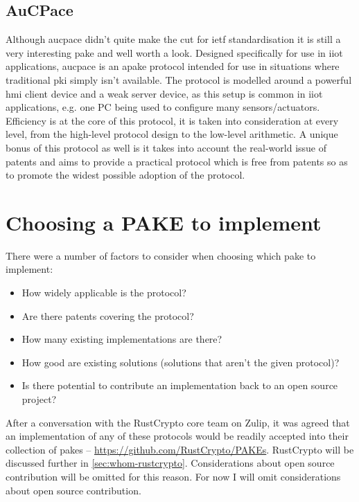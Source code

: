 \subsection{AuCPace}
Although \gls{aucpace} \cite{aucpace} didn't quite make the cut for \gls{ietf} standardisation it is still a very interesting \gls{pake} and well worth a look.
Designed specifically for use in \gls{iiot} applications, \gls{aucpace} is an \gls{apake} protocol intended for use in situations where traditional \gls{pki} simply isn't available.
The protocol is modelled around a powerful \gls{hmi} client device and a weak server device, as this setup is common in \gls{iiot} applications, e.g. one PC being used to configure many sensors/actuators.
Efficiency is at the core of this protocol, it is taken into consideration at every level, from the high-level protocol design to the low-level arithmetic.
A unique bonus of this protocol as well is it takes into account the real-world issue of patents and aims to provide a practical protocol which is free from patents so as to promote the widest possible adoption of the protocol.

\clearpage
\section{Choosing a PAKE to implement}
There were a number of factors to consider when choosing which \gls{pake} to implement:
\begin{itemize}
  \item{How widely applicable is the protocol?}
  \item{Are there patents covering the protocol?}
  \item{How many existing implementations are there?}
  \item{How good are existing solutions (solutions that aren't the given protocol)?}
  \item{Is there potential to contribute an implementation back to an open source project?}
\end{itemize}

After a conversation with the RustCrypto core team on Zulip, it was agreed that an implementation of any of these protocols would be readily accepted into their collection of \glspl{pake} -- \url{https://github.com/RustCrypto/PAKEs}.
RustCrypto will be discussed further in \cref{sec:whom-rustcrypto}.
Considerations about open source contribution will be omitted for this reason.
For now I will omit considerations about open source contribution.

